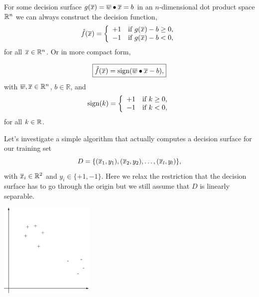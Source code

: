 \documentclass[a4paper,blends,pdf,colorBG,slideColor]{prosper}
\begin{document}
For some decision surface $g(\overline{x})=\overline{w}\bullet\overline{x} = b$ in an $n$-dimensional dot product space $\mathbb{R}^{n}$ we can always construct the decision function,
 \begin{equation*}
\hat{f}(\overline{x}) = \left\{
\begin{array}{ll}
+1 & \mbox{if $g(\overline{x}) -b \ge 0$,}\\
-1 & \mbox{if $g(\overline{x})-b < 0$,}
\end{array}
\right.
\end{equation*}
for all $\overline{x}\in \mathbb{R}^{n}$.
Or in more compact form,

\begin{equation*}
\label{eq:linear-decision-function}
\framebox{$\model{f}(\ol{x}) = \sign(\ol{w}\bullet\ol{x} - b),$}
\end{equation*}
with $\overline{w}, \overline{x}\in \mathbb{R}^{n}$, $b \in \mathbb{R}$, and
 \begin{equation*}
\sign(k) = \left\{
\begin{array}{ll}
+1 & \mbox{if $k \ge 0$,}\\
-1 & \mbox{if $k < 0$,}
\end{array}
\right.
\end{equation*}
for all $k \in \mathbb{R}$.

\es



Let's investigate a simple algorithm that actually computes a decision surface for our  training set 
\begin{equation*}
D = \{( {\overline{x}_1}, {y_1} ),( {\overline{x}_2}, {y_2} ),\ldots,( {\overline{x}_l}, {y_l} )\},
\end{equation*}
with $\overline{x}_i \in \mathbb{R}^{2}$ and $y_i \in \{+1, -1\}$.
 Here we relax the restriction that the decision surface has to go through the origin but
 we still assume that $D$ is linearly separable.
\begin{center}
\includegraphics[height=45mm]{figures/simple-data.eps}
\end{center}
\es
\end{document}
